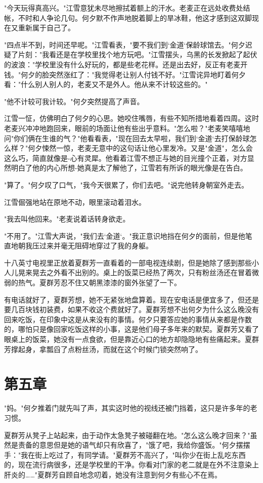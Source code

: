 \documentclass[UTF8]{ctexart}
\begin{document}
"今天玩得真高兴。"江雪意犹未尽地擦拭着额上的汗水。老麦正在远处收费处结帐，不时和人争论几句。何夕默不作声地脱着脚上的旱冰鞋，他这才感到这双脚现在又重新属于自己了。

"四点半不到，时间还早呢。"江雪看表，"要不我们到‘金道‘保龄球馆去。"何夕迟疑了片刻："我看还是在学校里找个地方玩吧。"江雪摆头，乌黑的长发掀起了起伏的波浪："学校里没有什么好玩的，都是些老花样。还是出去好，反正有老麦开钱。"何夕的脸突然涨红了："我觉得老让别人付钱不好。"江雪诧异地盯着何夕看："什么别人别人的，老麦又不是外人。他从来不计较这些的。"

"他不计较可我计较。"何夕突然提高了声音。

江雪一怔，仿佛明白了何夕的心思。她咬住嘴唇，有些不知所措地看着四周。这时老麦兴冲冲地跑回来，眼前的场面让他有些出乎意料。"怎么啦？"老麦笑嘻嘻地问"你们俩在生谁的气？"他看看表，"现在回去太早啦，我们到‘金道‘去打保龄球怎么样？"何夕悚然一惊，老麦无意中的这句话让他心里发冷。又是"金道"，怎么会这么巧，简直就像是-心有灵犀。他看着江雪不想正与她的目光撞个正着，对方显然明白了他的内心所想-她真是太了解他了，江雪若有所诉的眼光像是在告白。

"算了。"何夕叹了口气，"我今天很累了，你们去吧。"说完他转身朝室外走去。

江雪倔强地站在原地不动，眼里滚动着泪水。

"我去叫他回来。"老麦说着话转身欲走。

"不用了。"江雪大声说，"我们去‘金道‘。"我正意识地挡在何夕的面前，但是他笔直地朝我压过来并毫无阻碍地穿过了我的身躯。

十八英寸电视里正放着夏群芳一直看着的一部电视连续剧，但是她除了感到那些小人儿晃来晃去之外看不出别的。桌上的饭菜已经热了两次，只有粉丝汤还在冒着微弱的热气。夏群芳忍不住又朝黑漆漆的窗外张望了一下。

有电话就好了，夏群芳想，她不无紧张地盘算着。现在安电话是便宜多了，但还是要几百块钱初装费，如果不收这个费就好了。夏群芳想不出何夕为什么这么晚没有回来吃饭，在印象中这是从来没有的事情。何夕只要答应她的事情从来都是作数的，哪怕只是像回家吃饭这样的小事，这是他们母子多年来的默契。夏群芳又看了眼桌上的饭菜，她没有一点食欲，但是靠近心口的地方却隐隐地有些痛起来。夏群芳撑起身，拿瓢舀了点粉丝汤，而就在这个时候门锁突然响了。
\clearpage

\section*{第五章}
"妈。"何夕推着门就先叫了声，其实这时他的视线还被门挡着，这只是许多年的老习惯。

夏群芳从凳子上站起来，由于动作太急凳子被碰翻在地。"怎么这么晚才回来？"虽然是责备的意思但是她的语气却只有欣喜了，"饿了吧，我给你盛饭。"何夕摆摆手："我在街上吃过了，有同学请。"夏群芳不高兴了，"叫你少在街上乱吃东西的，现在流行病很多，还是学校里的干净。你看对门家的老二就是在外不注意染上肝炎的……"夏群芳自顾自地念叨着，她没有注意到何夕有些心不在焉。
\end{document}
